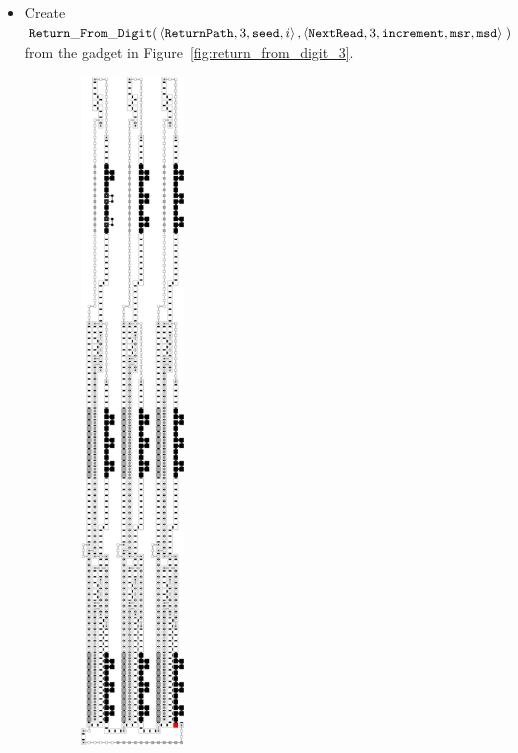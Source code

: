 \begin{itemize}
    \item Create
    $\begin{aligned}[t]
        {\tt Return\_From\_Digit}(&\left\langle {\tt ReturnPath}, 3, {\tt seed}, i                        \right\rangle,
                          \left\langle {\tt NextRead},   3, {\tt increment}, {\tt msr}, {\tt msd}\right\rangle \;)
    \end{aligned}$\\from the gadget in Figure~\ref{fig:return_from_digit_3}.
\end{itemize}




\begin{figure}[H]
    \centering
    \begin{subfigure}[t]{0.3\textwidth}
        \centering
        \includegraphics[width=0.3\textwidth]{initial_value_overview_case3}

\end{subfigure}
\end{figure}
